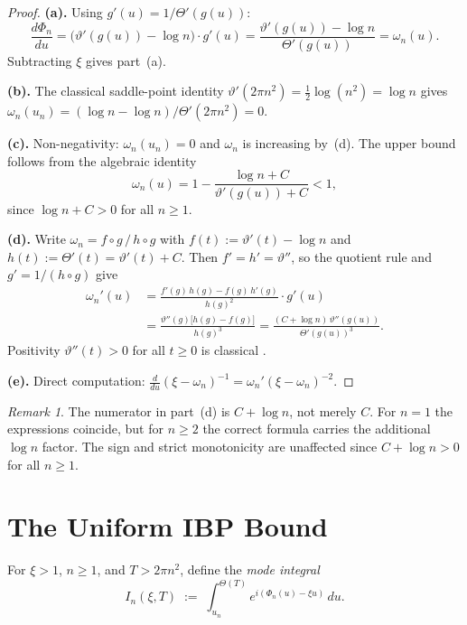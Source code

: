 \documentclass[12pt]{amsart}
\theoremstyle{definition}
\theoremstyle{remark}
\newtheorem{remark}[theorem]{Remark}
\begin{document}
\begin{proof}
\textbf{(a).}
Using $g'(u)=1/\Theta'(g(u))$:
\[
  \frac{d\Phi_n}{du}
  =\bigl(\vartheta'(g(u))-\log n\bigr)\cdot g'(u)
  =\frac{\vartheta'(g(u))-\log n}{\Theta'(g(u))}
  =\omega_n(u).
\]
Subtracting $\xi$ gives part~(a).

\smallskip\noindent
\textbf{(b).}
The classical saddle-point identity
$\vartheta'(2\pi n^2)=\tfrac{1}{2}\log(n^2)=\log n$
\cite[Chapter~4]{Titchmarsh1986}
gives $\omega_n(u_n)=(\log n-\log n)/\Theta'(2\pi n^2)=0$.

\smallskip\noindent
\textbf{(c).}
Non-negativity: $\omega_n(u_n)=0$ and $\omega_n$ is increasing by~(d).
The upper bound follows from the algebraic identity
\[
  \omega_n(u)
  =1-\frac{\log n+C}{\vartheta'(g(u))+C}
  <1,
\]
since $\log n+C>0$ for all $n\ge 1$.

\smallskip\noindent
\textbf{(d).}
Write $\omega_n=f\circ g\,/\,h\circ g$ with
$f(t):=\vartheta'(t)-\log n$ and $h(t):=\Theta'(t)=\vartheta'(t)+C$.
Then $f'=h'=\vartheta''$, so the quotient rule and $g'=1/(h\circ g)$ give
\begin{align*}
  \omega_n'(u)
  &=\frac{f'(g)\,h(g)-f(g)\,h'(g)}{h(g)^{2}}\cdot g'(u)\\[4pt]
  &=\frac{\vartheta''(g)\bigl[h(g)-f(g)\bigr]}{h(g)^{3}}
  =\frac{(C+\log n)\,\vartheta''(g(u))}{\Theta'(g(u))^{3}}.
\end{align*}
Positivity $\vartheta''(t)>0$ for all $t\ge 0$ is classical
\cite[5.15.3]{DLMF}.

\smallskip\noindent
\textbf{(e).}
Direct computation:
$\tfrac{d}{du}(\xi-\omega_n)^{-1}=\omega_n'(\xi-\omega_n)^{-2}$.
\end{proof}

\begin{remark}\label{rem:formula-d}
The numerator in part~(d) is $C+\log n$, not merely $C$.
For $n=1$ the expressions coincide, but for $n\ge 2$ the correct
formula carries the additional $\log n$ factor.  The sign and
strict monotonicity are unaffected since $C+\log n>0$ for all $n\ge 1$.
\end{remark}

\section{The Uniform IBP Bound}

For $\xi>1$, $n\ge 1$, and $T>2\pi n^2$, define the \emph{mode integral}
\begin{equation}\label{eq:In}
  I_n(\xi,T)
  \;:=\;\int_{u_n}^{\Theta(T)}e^{i(\Phi_n(u)-\xi u)}\,du.
\end{equation}
\end{document}
